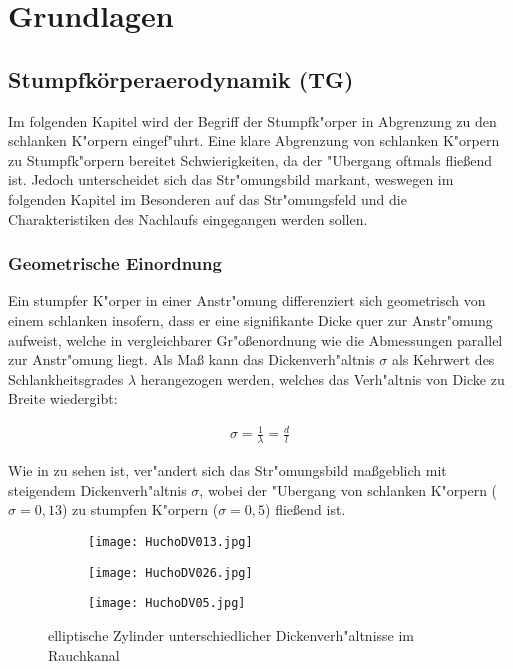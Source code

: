 \chapter{Grundlagen}\label{s:grundlagen}

\section{Stumpfk\"orperaerodynamik (TG)}


Im folgenden Kapitel wird der Begriff der Stumpfk"orper in Abgrenzung zu den schlanken K"orpern eingef"uhrt. Eine klare Abgrenzung von schlanken K"orpern zu Stumpfk"orpern bereitet Schwierigkeiten, da der "Ubergang oftmals flie\ss{}end ist. Jedoch unterscheidet sich das Str"omungsbild markant, weswegen im folgenden Kapitel im Besonderen auf das Str"omungsfeld und die Charakteristiken des Nachlaufs eingegangen werden sollen.

\subsection{Geometrische Einordnung}
\label{sec:Geometrie}
Ein stumpfer K"orper in einer Anstr"omung differenziert sich geometrisch von einem schlanken insofern, dass er eine signifikante Dicke quer zur Anstr"omung aufweist, welche in vergleichbarer Gr"o\ss{}enordnung wie die Abmessungen parallel zur Anstr"omung liegt. Als Ma\ss{} kann das Dickenverh"altnis $\sigma$ als Kehrwert des Schlankheitsgrades $\lambda$ herangezogen werden, welches das Verh"altnis von Dicke zu Breite wiedergibt:

\begin{align}
\sigma = \frac{1}{\lambda} = \frac{d}{l}
\end{align}

Wie in  zu sehen ist, ver"andert sich das Str"omungsbild ma\ss{}geblich mit steigendem Dickenverh"altnis $\sigma$, wobei der "Ubergang von schlanken K"orpern ($\sigma = 0,13$) zu stumpfen K"orpern ($\sigma = 0,5$) flie\ss{}end ist.

\begin{figure}[h]
	\centering
	\begin{subfigure}[c]{0.45\textwidth}		
		\texttt{[image: HuchoDV013.jpg]}
	\end{subfigure}
	\begin{subfigure}[c]{0.45\textwidth}
		\texttt{[image: HuchoDV026.jpg]}
	\end{subfigure}
	\begin{subfigure}[c]{0.45\textwidth}
		\texttt{[image: HuchoDV05.jpg]}
	\end{subfigure}
	\caption{elliptische Zylinder unterschiedlicher Dickenverh"altnisse im Rauchkanal \cite{Hucho.2011}}
	\label{fig:HuchoDV}
\end{figure}


